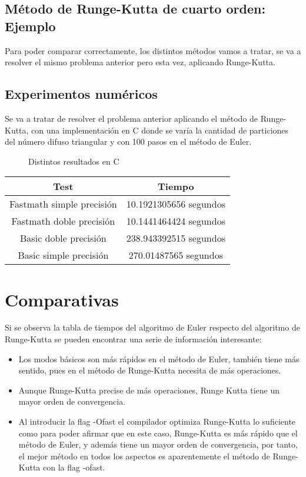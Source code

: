 \subsection{Método de Runge-Kutta de cuarto orden: Ejemplo}
Para poder comparar correctamente, los distintos métodos vamos a tratar, se va a resolver el mismo problema anterior pero esta vez, aplicando Runge-Kutta.

\subsection{Experimentos numéricos}
Se va a tratar de resolver el problema anterior aplicando el método de Runge-Kutta, con una implementación en C donde se varía la cantidad de particiones del número difuso triangular y con 100 pasos en el método de Euler.

\begin{figure}[H]
	\centering
	\caption{Distintos resultados en C}
	\label{fig:rungekuttacseq}
\end{figure}

\begin{table}[H]
	\centering
	\begin{tabular}{|c|c|}
		\hline
		\textbf{Test}  & \textbf{Tiempo}        \\ \hline
		Fastmath simple precisión   & 10.1921305656 segundos    \\
		Fastmath doble precisión  & 10.1441464424 segundos   \\
		Basic doble precisión  &238.943392515 segundos    \\
	    Basic simple precisión & 270.01487565 segundos \\ 
		\hline
	\end{tabular}%
\end{table}

\section{Comparativas}
Si se observa la tabla de tiempos del algoritmo de Euler respecto del algoritmo de Runge-Kutta se pueden encontrar una serie de información interesante:

\begin{itemize}
	\item Los modos básicos son más rápidos en el método de Euler, también tiene más sentido, pues en el método de Runge-Kutta necesita de más operaciones.
	
	\item Aunque Runge-Kutta precise de más operaciones, Runge Kutta tiene un mayor orden de convergencia.
	
	\item Al introducir la flag -Ofast el compilador optimiza Runge-Kutta lo suficiente como para poder afirmar que en este caso, Runge-Kutta es más rápido que el método de Euler, y además tiene un mayor orden de convergencia, por tanto, el mejor método en todos los aspectos es aparentemente el método de Runge-Kutta con la flag -ofast.
\end{itemize}

